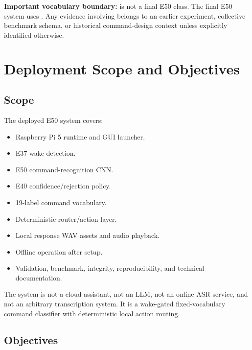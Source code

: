 \documentclass[11pt]{article}
\newcommand{\code}[1]{\texttt{\detokenize{#1}}}
\begin{document}
\noindent
\textbf{Important vocabulary boundary:} \code{COLOR} is not a final E50 class. The final E50 system uses \code{LIGHT_DIM}. Any evidence involving \code{COLOR} belongs to an earlier experiment, collective benchmark schema, or historical command-design context unless explicitly identified otherwise.

\section{Deployment Scope and Objectives}

\subsection{Scope}

The deployed E50 system covers:

\begin{itemize}
\item Raspberry Pi 5 runtime and GUI launcher.
\item E37 wake detection.
\item E50 command-recognition CNN.
\item E40 confidence/rejection policy.
\item 19-label command vocabulary.
\item Deterministic router/action layer.
\item Local response WAV assets and audio playback.
\item Offline operation after setup.
\item Validation, benchmark, integrity, reproducibility, and technical documentation.
\end{itemize}

The system is not a cloud assistant, not an LLM, not an online ASR service, and not an arbitrary transcription system. It is a wake-gated fixed-vocabulary command classifier with deterministic local action routing.

\subsection{Objectives}
\end{document}
